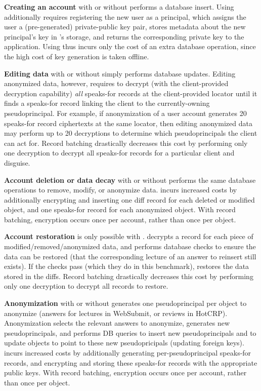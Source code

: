 \textbf{Creating an account} with or without \sys performs a database insert. Using \sys additionally
requires registering the new user as a principal, which assigns the user a (pre-generated)
private-public key pair, stores metadata about the new principal's key in \sys's storage, and
returns the corresponding private key to the application.
Using \sys thus incurs only the cost of an extra database operation, since the high cost of key
generation is taken offline.

\textbf{Editing data} with or without \sys simply performs database updates. Editing anonymized
data, however, requires \sys to decrypt (with the client-provided decryption capability) \emph{all}
speaks-for records at the client-provided locator until it finds a speaks-for record linking the
client to the currently-owning pseudoprincipal.  For example, if anonymization of a user account
generates 20 speaks-for record ciphertexts at the same locator, then editing anonymized data may
perform up to 20 decryptions to determine which pseudoprincipals the client can act for.  Record
batching drastically decreases this cost by performing only one decryption to decrypt all speaks-for
records for a particular client and disguise.

\textbf{Account deletion or data decay} with or without \sys performs the same database operations
to remove, modify, or anonymize data. \sys incurs increased costs by additionally encrypting and
inserting one diff record for each deleted or modified object, and one speaks-for record for each
anonymized object.  With record batching, encryption occurs once per account, rather than once per
object.

\textbf{Account restoration} is only possible with \sys. \sys decrypts a record for each
piece of modified/removed/anonymized data, and performs database checks to ensure the data can be restored
(\eg that the corresponding lecture of an answer to reinsert still exists). If the checks pass
(which they do in this benchmark), \sys restores the data stored in the diffs.
Record batching drastically decreases this cost by performing only one decryption to decrypt all
records to restore.

\textbf{Anonymization} with or without \sys generates one pseudoprincipal per object to anonymize
(\eg answers for lectures in WebSubmit, or reviews in HotCRP). Anonymization selects the relevant answers
to anonymize, generates new pseudoprincipals, and performs DB queries to insert new pseudoprincipals
and to update objects to point to these new pseudopricipals (\eg updating foreign keys).
\sys incurs increased costs by additionally generating per-pseudoprincipal speaks-for records, and
encrypting and storing these speaks-for records with the appropriate public keys.
With record batching, encryption occurs once per account, rather than once per object.

